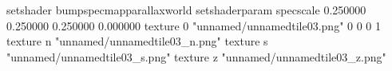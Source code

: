 setshader bumpspecmapparallaxworld
setshaderparam specscale 0.250000 0.250000 0.250000 0.000000
texture 0 "unnamed/unnamedtile03.png" 0 0 0 1
texture n "unnamed/unnamedtile03_n.png"
texture s "unnamed/unnamedtile03_s.png"
texture z "unnamed/unnamedtile03_z.png"